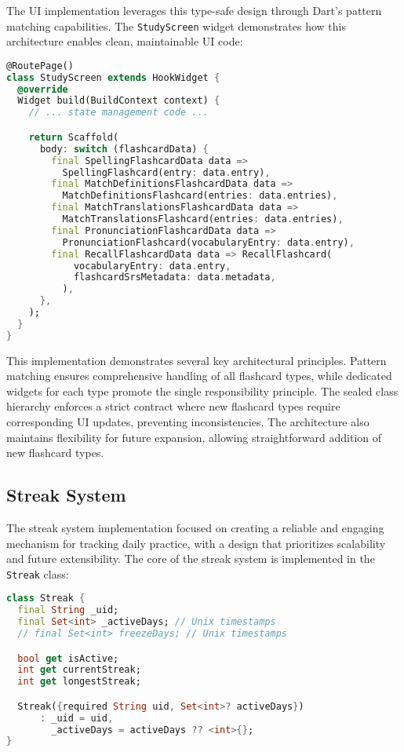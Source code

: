 The UI implementation leverages this type-safe design through Dart's pattern matching capabilities. The \texttt{StudyScreen} widget demonstrates how this architecture enables clean, maintainable UI code:

\begin{lstlisting}[language=Dart, caption={StudyScreen widget with pattern matching}, label=lst:study-screen]
@RoutePage()
class StudyScreen extends HookWidget {
  @override
  Widget build(BuildContext context) {
    // ... state management code ...

    return Scaffold(
      body: switch (flashcardData) {
        final SpellingFlashcardData data =>
          SpellingFlashcard(entry: data.entry),
        final MatchDefinitionsFlashcardData data =>
          MatchDefinitionsFlashcard(entries: data.entries),
        final MatchTranslationsFlashcardData data =>
          MatchTranslationsFlashcard(entries: data.entries),
        final PronunciationFlashcardData data =>
          PronunciationFlashcard(vocabularyEntry: data.entry),
        final RecallFlashcardData data => RecallFlashcard(
            vocabularyEntry: data.entry,
            flashcardSrsMetadata: data.metadata,
          ),
      },
    );
  }
}
\end{lstlisting}

This implementation demonstrates several key architectural principles. Pattern matching ensures comprehensive handling of all flashcard types, while dedicated widgets for each type promote the single responsibility principle. The sealed class hierarchy enforces a strict contract where new flashcard types require corresponding UI updates, preventing inconsistencies. The architecture also maintains flexibility for future expansion, allowing straightforward addition of new flashcard types.

\subsection{Streak System}

The streak system implementation focused on creating a reliable and engaging mechanism for tracking daily practice, with a design that prioritizes scalability and future extensibility. The core of the streak system is implemented in the \texttt{Streak} class:

\begin{lstlisting}[language=Dart, caption={Streak class implementation}, label=lst:streak-class]
class Streak {
  final String _uid;
  final Set<int> _activeDays; // Unix timestamps
  // final Set<int> freezeDays; // Unix timestamps

  bool get isActive;
  int get currentStreak;
  int get longestStreak;

  Streak({required String uid, Set<int>? activeDays})
      : _uid = uid,
        _activeDays = activeDays ?? <int>{};
}
\end{lstlisting}

